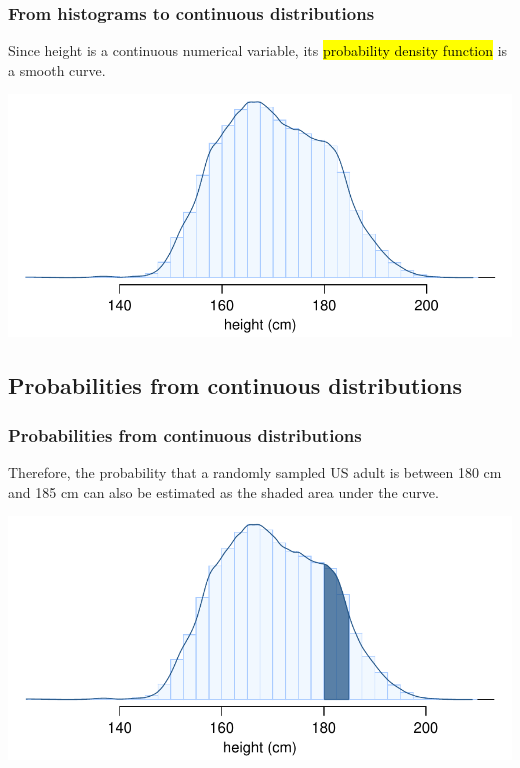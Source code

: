 \begin{frame}
\frametitle{From histograms to continuous distributions}

Since height is a continuous numerical variable, its \hl{probability density function} is a smooth curve.

\begin{center}
\includegraphics[width=\textwidth]{2-5_continuous_distributions/figures/fdicHeightContDist/fdicHeightContDist}
\end{center}

\end{frame}


\subsection{Probabilities from continuous distributions}

\begin{frame}
\frametitle{Probabilities from continuous distributions}

Therefore, the probability that a randomly sampled US adult is between 180 cm and 185 cm can also be estimated as the shaded area under the curve.

\begin{center}
\includegraphics[width=\textwidth]{2-5_continuous_distributions/figures/fdicHeightContDistFilled/fdicHeightContDistFilled}
\end{center}


\end{frame}

